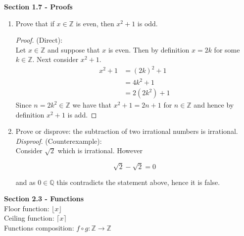 \documentclass[11pt]{article}
\begin{document}
\vspace{0.5cm}



{\large\textbf{Section 1.7 - Proofs}}

\begin{enumerate}
\item Prove that if $x \in \mathbb{Z}$ is even, then $x^2 + 1$ is odd.


\begin{proof}
(Direct): \\

Let $x\in \mathbb{Z}$ and suppose that $x$ is even. Then by definition $x = 2k$ for some $k \in \mathbb{Z}$. Next consider $x^2 + 1$.
\begin{align*}
x^2+ 1 & = (2k)^2 + 1\\
&= 4k^2 + 1\\
&= 2(2k^2) + 1
\end{align*}
Since $n=2k^2 \in \mathbb{Z}$ we have that $x^2+1 = 2n + 1$ for $n \in \mathbb{Z}$ and hence by definition $x^2 + 1$ is add.
\end{proof}



\item Prove or disprove: the subtraction of two irrational numbers is irrational.\\

\textit{Disproof}. (Counterexample):\\

Consider $\sqrt{2}$  which is irrational. However 

$$\sqrt{2} - \sqrt{2} = 0$$

and as $0 \in \mathbb{Q}$ this contradicts the statement above, hence it is false.\\


\end{enumerate}



\newpage %

{\large\textbf{Section 2.3 - Functions}}\\

Floor function: $\lfloor x \rfloor$\\

Ceiling function: $\lceil x \rceil$\\

Functions composition: $f \circ  g: \mathbb{Z} \rightarrow \mathbb{Z}$\\
\end{document}
